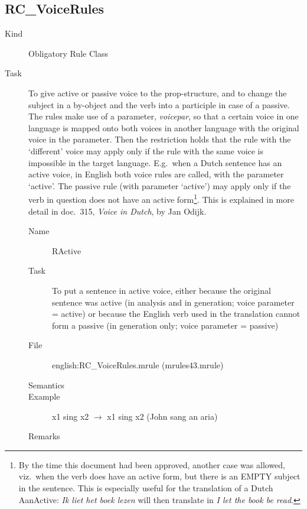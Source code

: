 \newpage
\subsection{RC\_VoiceRules}

\begin{description}
\item[Kind] Obligatory Rule Class
\item[Task] To give active or passive voice to the prop-structure, and to 
change the subject in a by-object and the verb into a participle 
in case of a passive. The rules make use of a 
parameter, {\em voicepar\/}, so that a certain voice in one language is mapped 
onto both voices 
in another language with the original voice in the parameter. Then the 
restriction holds that the rule with the `different' voice may apply only if 
the rule with the same voice is impossible in the target language. E.g.\ when 
a Dutch 
sentence has an active voice, in English both voice rules are called, with the 
parameter `active'. The passive rule (with parameter `active') may apply only 
if the verb in question does not have an active form\footnote{By the time this 
document had been approved, another case was allowed, viz.\ when the verb does 
have an active form, but there is an EMPTY subject in the sentence. This is 
especially useful for the translation of a Dutch AanActive: {\em Ik liet het 
boek lezen\/} will then translate in {\em I let the book be read\/}. }. 
This is explained in more 
detail in doc.\ 315, {\em Voice in Dutch\/}, by Jan Odijk.

\vspace{1 cm}
\begin{description}
\item[Name] RActive
\item[Task] To put a sentence in active voice, either because the original 
sentence was active (in analysis and in generation; voice parameter = active)
or because the English verb used in the translation cannot form a passive 
(in generation only; voice parameter = passive)
\item[File] english:RC\_VoiceRules.mrule (mrules43.mrule)
\item[Semantics]
\item[Example] x1 sing x2 $\rightarrow$ x1 sing x2 (John sang an aria)
\item[Remarks]
\end{description}


\end{description}
